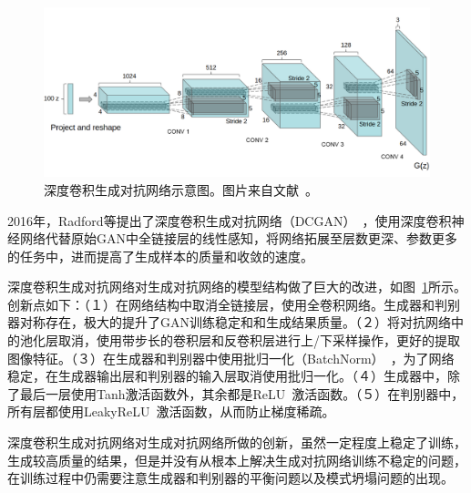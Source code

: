 \begin{figure}[ht]
    \centering
	\includegraphics[width=\textwidth]{figures/DCGAN.png}
	\caption{深度卷积生成对抗网络示意图。图片来自文献~\cite{radford2015unsupervised}。}
	\label{fig:pic_dCGAN}
\end{figure}

2016年，Radford等提出了深度卷积生成对抗网络（DCGAN）~\cite{radford2015unsupervised}，使用深度卷积神经网络代替原始GAN中全链接层的线性感知，将网络拓展至层数更深、参数更多的任务中，进而提高了生成样本的质量和收敛的速度。

深度卷积生成对抗网络对生成对抗网络的模型结构做了巨大的改进，如图~\ref{fig:pic_dCGAN}所示。创新点如下：（１）在网络结构中取消全链接层，使用全卷积网络。生成器和判别器对称存在，极大的提升了GAN训练稳定和和生成结果质量。（２）将对抗网络中的池化层取消，使用带步长的卷积层和反卷积层进行上/下采样操作，更好的提取图像特征。（３）在生成器和判别器中使用批归一化（BatchNorm）~\cite{ioffe2015batch}，为了网络稳定，在生成器输出层和判别器的输入层取消使用批归一化。（４）生成器中，除了最后一层使用Tanh激活函数外，其余都是ReLU~\cite{nair2010rectified}激活函数。（５）在判别器中，所有层都使用LeakyReLU~\cite{xu2015empirical}激活函数，从而防止梯度稀疏。

深度卷积生成对抗网络对生成对抗网络所做的创新，虽然一定程度上稳定了训练，生成较高质量的结果，但是并没有从根本上解决生成对抗网络训练不稳定的问题，在训练过程中仍需要注意生成器和判别器的平衡问题以及模式坍塌问题的出现。


